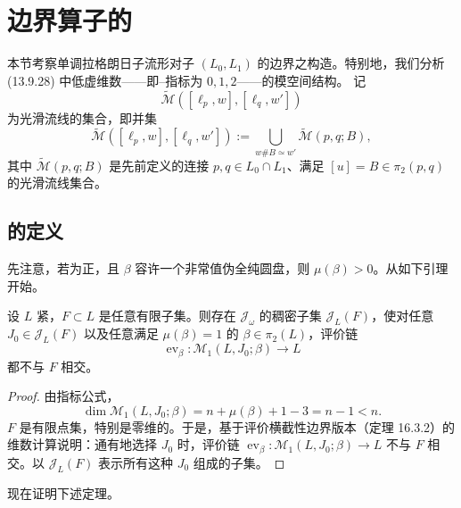 \section{\personFloer{}边界算子的\termAnomaly{}}
\label{sec:anomaly-floer-boundary-operator}

本节考察单调拉格朗日子流形对子 $(L_0,L_1)$ 的\personFloer{}边界之构造。特别地，我们分析
(13.9.28) 中低虚维数——即\personMaslov{}--\personViterbo{}指标为 $0,1,2$——的\personFloer{}模空间结构。
记
\[
 \widetilde{\mathcal M}([\ell_p,w],[\ell_q,w'])
\]
为光滑\personFloer{}流线的集合，即并集
\[
 \widetilde{\mathcal M}([\ell_p,w],[\ell_q,w'])
 :=\bigcup_{w\#B\simeq w'}\widetilde{\mathcal M}(p,q;B),
\]
其中 $\widetilde{\mathcal M}(p,q;B)$ 是先前定义的连接 $p,q\in L_0\cap L_1$、满足
$[u]=B\in\pi_2(p,q)$ 的光滑\personFloer{}流线集合。

\subsection{\personFloer{} \termPreBoundaryMap{}的定义}
\label{subsec:floer-pre-boundary-definition}

先注意，若\termMonotonicityConstant{}为正，且 $\beta$ 容许一个非常值伪全纯圆盘，则
$\mu(\beta)>0$。从如下引理开始。

\begin{lemma}
\label{lem:maslov-one-discs-avoid-finite-set}
设 $L$ 紧，$F\subset L$ 是任意有限子集。则存在
$\mathcal J_\omega$ 的稠密子集 $\mathcal J_L(F)$，使对任意
$J_0\in\mathcal J_L(F)$ 以及任意满足 $\mu(\beta)=1$ 的
$\beta\in\pi_2(L)$，评价链
\[
 \operatorname{ev}_\beta:\mathcal M_1(L,J_0;\beta)\longrightarrow L
\]
都不与 $F$ 相交。
\end{lemma}

\begin{proof}
由指标公式，
\[
 \dim\mathcal M_1(L,J_0;\beta)=n+\mu(\beta)+1-3=n-1<n.
\]
$F$ 是有限点集，特别是零维的。于是，基于评价横截性边界版本（定理 16.3.2）的
维数计算说明：通有地选择 $J_0$ 时，评价链
$\operatorname{ev}_\beta:\mathcal M_1(L,J_0;\beta)\to L$ 不与 $F$ 相交。以
$\mathcal J_L(F)$ 表示所有这种 $J_0$ 组成的子集。
\end{proof}

现在证明下述定理。

